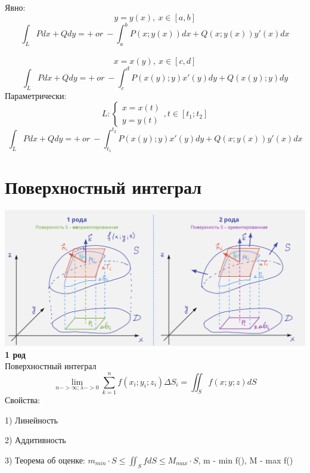 \documentclass{article}
\begin{document}
Явно:
\begin{equation*}
    y= y(x),\ x\in [a,b]
\end{equation*}
\begin{equation*}
    \int_{L}^{}Pdx+Qdy = +\  or\ - \int_{a}^{b}P(x;y(x))dx+Q(x;y(x))y'(x)dx
\end{equation*}
\\
\begin{equation*}
    x= x(y),\ x\in [c,d]
\end{equation*}
\begin{equation*}
    \int_{L}^{} Pdx +Qdy = +\ or\ -\int_{c}^{d}P(x(y);y)x'(y)dy +Q(x(y);y)dy
\end{equation*}
Параметрически:
\begin{equation*}
    L: \begin{cases}
        x=x(t)\\
        y=y(t)
    \end{cases}, t\in[t_1;t_2]
\end{equation*}
\begin{equation*}
    \int_{L}^{}Pdx+Qdy = +\ or \ - \int_{t_1}^{t_2}P(x(y);y)x'(y)dy +Q(x;y(x))y'(x)dx
\end{equation*}

\section{Поверхностный интеграл}
\includegraphics[width=.8\textwidth]{butilka.png}
\\ 
\textbf{1 род}
\\
Поверхностный интеграл
\begin{equation*}
    \lim_{n->\infty; \lambda->0}\sum_{k=1}^{n}f(x_i;y_i;z_i)\Delta S_i =\iint_S f(x;y;z)dS 
\end{equation*}
Свойства:

1) Линейность

2) Аддитивность

3) Теорема об оценке: $m_{min} \cdot S \leq \iint_S fdS\leq M_{max}\cdot S$, m - min f(), M - max f()
\end{document}
